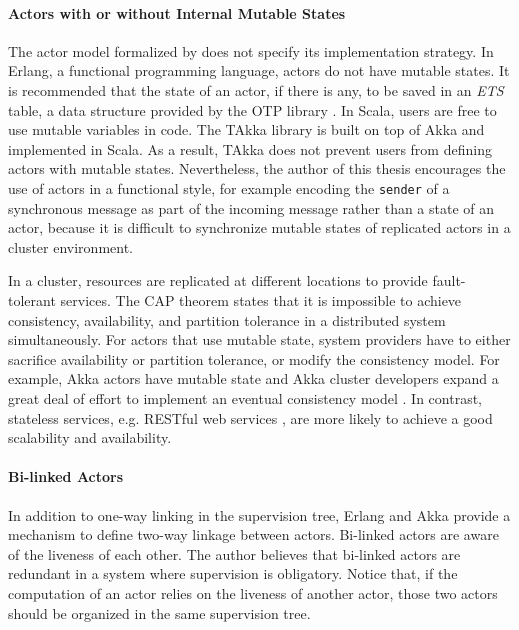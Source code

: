 \paragraph{Actors with or without Internal Mutable States}
The actor model formalized by \citet{Hewitt:1973} does not 
specify its implementation strategy.  In Erlang, a functional programming 
language, actors do not have mutable states.  It is recommended that the state 
of an actor, if there is any, to be saved in an {\it ETS} table, a data structure 
provided by the OTP library \citep{ErlangManual}.  In Scala, users are free
to use mutable variables in code.
The TAkka library is built on top of Akka and implemented in Scala.  
As a result, TAkka does not prevent users from defining actors with 
mutable states.  
Nevertheless, the author of this thesis encourages the use of 
actors in a functional style, for example encoding the {\tt sender} of a 
synchronous message as part of the incoming message rather than a state 
of an actor, because it is difficult to synchronize mutable
states of replicated actors in a cluster environment.

In a cluster, resources are replicated at different locations to provide 
fault-tolerant services.  The CAP theorem \citep{CAP} states that it is
impossible to achieve consistency, availability, and partition tolerance in a
distributed system simultaneously.  For actors that use mutable state, system 
providers have to either sacrifice 
availability or partition tolerance, or modify the consistency model.  For 
example, Akka actors have mutable state and Akka cluster developers
expand a great deal of effort to implement an eventual consistency model \citep{Kuhn12}.
In contrast, stateless services, e.g. RESTful web services 
\citep{Fielding:2002}, are more likely to achieve a good scalability and 
availability.



\paragraph{Bi-linked Actors}
In addition to one-way linking in the supervision tree, Erlang and Akka
provide a mechanism to define two-way linkage between actors. 
Bi-linked actors are aware of the liveness of each other.  The author believes 
that bi-linked actors are redundant in a system where supervision is
obligatory.  Notice that, if the computation of an actor relies on the liveness
of another actor, those two actors should be organized in the same 
supervision tree.

